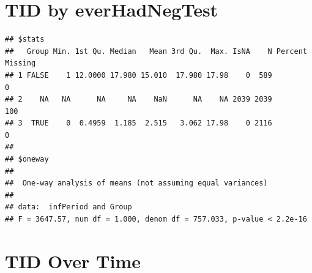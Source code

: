 \documentclass{article}\usepackage[]{graphicx}\usepackage[]{color}
\makeatletter
\newenvironment{kframe}{%
 \def\at@end@of@kframe{}%
 \ifinner\ifhmode%
  \def\at@end@of@kframe{\end{minipage}}%
  \begin{minipage}{\columnwidth}%
 \fi\fi%
 \def\FrameCommand##1{\hskip\@totalleftmargin \hskip-\fboxsep
 \colorbox{shadecolor}{##1}\hskip-\fboxsep
     \hskip-\linewidth \hskip-\@totalleftmargin \hskip\columnwidth}%
 \MakeFramed {\advance\hsize-\width
   \@totalleftmargin\z@ \linewidth\hsize
   \@setminipage}}%
 {\par\unskip\endMakeFramed%
 \at@end@of@kframe}
\newenvironment{knitrout}{}{} %
\makeatother
\begin{document}
\section{TID by everHadNegTest}

\begin{knitrout}\footnotesize
{}\color{fgcolor}\begin{kframe}
\begin{verbatim}
## $stats
##   Group Min. 1st Qu. Median   Mean 3rd Qu.  Max. IsNA    N Percent Missing
## 1 FALSE    1 12.0000 17.980 15.010  17.980 17.98    0  589               0
## 2    NA   NA      NA     NA    NaN      NA    NA 2039 2039             100
## 3  TRUE    0  0.4959  1.185  2.515   3.062 17.98    0 2116               0
## 
## $oneway
## 
## 	One-way analysis of means (not assuming equal variances)
## 
## data:  infPeriod and Group
## F = 3647.57, num df = 1.000, denom df = 757.033, p-value < 2.2e-16
\end{verbatim}
\end{kframe}
\end{knitrout}


\section{TID Over Time}
\end{document}
